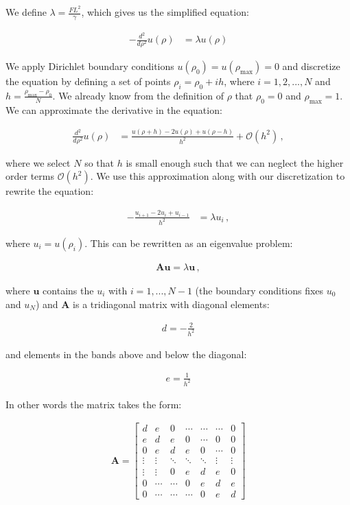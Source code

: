 \documentclass[reprint,english,notitlepage]{revtex4-1}  %
\begin{document}
We define $\lambda = \frac{FL^2}{\gamma}$, which gives us the simplified equation:

\begin{align*}
- \frac{d^2}{d\rho^2} u(\rho) &= \lambda u (\rho)
\end{align*}

We apply Dirichlet boundary conditions $u(\rho_0) = u(\rho_\text{max}) = 0$ and discretize the equation by defining a set of points $\rho_i = \rho_0 + ih$, where $i = 1,2,...,N$ and $h = \frac{\rho_\text{max} - \rho_0}{N}$. We already know from the definition of $\rho$ that $\rho_0 = 0$ and $\rho_\text{max} = 1$. We can approximate the derivative in the equation:

\begin{align*}
\frac{d^2}{d\rho^2} u(\rho) &=  \frac{u(\rho+h) - 2u (\rho)  + u(\rho - h) }{h^2} + \mathcal{O}(h^2)  \, ,
\end{align*}

where we select $N$ so that $h$ is small enough such that we can neglect the higher order terms $\mathcal{O}(h^2)$. We use this approximation along with our discretization to rewrite the equation:

\begin{align*}
-\frac{u_{i+1} - 2u_i + u_{i-1}}{h^2} &= \lambda u_i \, ,
\end{align*}

where $u_i = u(\rho_i)$. This can be rewritten as an eigenvalue problem:

\begin{align*}
\textbf{Au} = \lambda \textbf{u} \, ,
\end{align*}

where $\textbf{u}$ contains the $u_i$ with $i = 1,...,N-1$ (the boundary conditions fixes $u_0$ and $u_N$) and $\textbf{A}$ is a tridiagonal matrix with diagonal elements:

\begin{align*}
d = -\frac{2}{h^2}
\end{align*}

and elements in the bands above and below the diagonal:

\begin{align*}
e = \frac{1}{h^2}
\end{align*}

In other words the matrix takes the form:

\begin{align*}
\textbf{A} = \begin{bmatrix}
d & e & 0 & \cdots  & \cdots & \cdots & 0  \\
e & d & e & 0 & \cdots & 0 & 0 \\
0 & e & d & e & 0 & \cdots & 0 \\
\vdots & \vdots & \ddots & \ddots & \ddots & \vdots &  \vdots \\
\vdots & \vdots & 0 & e & d & e & 0 \\
0 & \cdots & \cdots & 0 & e & d & e \\
0 & \cdots & \cdots & \cdots & 0 & e & d
\end{bmatrix}
\end{align*}
\end{document}
